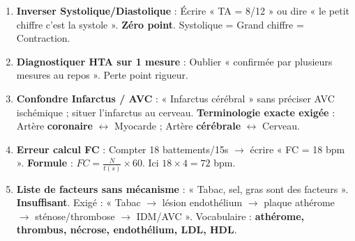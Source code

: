 \documentclass[11pt]{article}
\begin{document}
\begin{attention}
\begin{enumerate}
\item \textbf{Inverser Systolique/Diastolique} : Écrire « TA = 8/12 » ou dire « le petit chiffre c'est la systole ». \textbf{Zéro point}. Systolique = Grand chiffre = Contraction.
\item \textbf{Diagnostiquer HTA sur 1 mesure} : Oublier « confirmée par plusieurs mesures au repos ». Perte point rigueur.
\item \textbf{Confondre Infarctus / AVC} : « Infarctus cérébral » sans préciser AVC ischémique ; situer l'infarctus au cerveau. \textbf{Terminologie exacte exigée} : Artère \textbf{coronaire} $\leftrightarrow$ Myocarde ; Artère \textbf{cérébrale} $\leftrightarrow$ Cerveau.
\item \textbf{Erreur calcul FC} : Compter 18 battements/15s $\rightarrow$ écrire « FC = 18 bpm ». \textbf{Formule} : $FC = \frac{N}{t(s)} \times 60$. Ici $18 \times 4 = 72$ bpm.
\item \textbf{Liste de facteurs sans mécanisme} : « Tabac, sel, gras sont des facteurs ». \textbf{Insuffisant}. Exigé : « Tabac $\rightarrow$ lésion endothélium $\rightarrow$ plaque athérome $\rightarrow$ sténose/thrombose $\rightarrow$ IDM/AVC ». Vocabulaire : \textbf{athérome, thrombus, nécrose, endothélium, LDL, HDL}.
\end{enumerate}
\end{attention}
\end{document}
